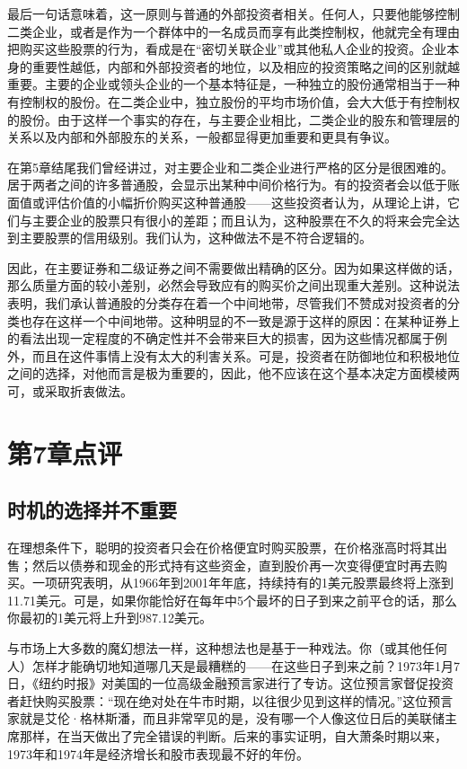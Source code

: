 \documentclass[12pt,oneside]{book}
\begin{document}
最后一句话意味着，这一原则与普通的外部投资者相关。任何人，只要他能够控制二类企业，或者是作为一个群体中的一名成员而享有此类控制权，他就完全有理由把购买这些股票的行为，看成是在“密切关联企业”或其他私人企业的投资。企业本身的重要性越低，内部和外部投资者的地位，以及相应的投资策略之间的区别就越重要。主要的企业或领头企业的一个基本特征是，一种独立的股份通常相当于一种有控制权的股份。在二类企业中，独立股份的平均市场价值，会大大低于有控制权的股份。由于这样一个事实的存在，与主要企业相比，二类企业的股东和管理层的关系以及内部和外部股东的关系，一般都显得更加重要和更具有争议。

在第5章结尾我们曾经讲过，对主要企业和二类企业进行严格的区分是很困难的。居于两者之间的许多普通股，会显示出某种中间价格行为。有的投资者会以低于账面值或评估价值的小幅折价购买这种普通股——这些投资者认为，从理论上讲，它们与主要企业的股票只有很小的差距；而且认为，这种股票在不久的将来会完全达到主要股票的信用级别。我们认为，这种做法不是不符合逻辑的。

因此，在主要证券和二级证券之间不需要做出精确的区分。因为如果这样做的话，那么质量方面的较小差别，必然会导致应有的购买价之间出现重大差别。这种说法表明，我们承认普通股的分类存在着一个中间地带，尽管我们不赞成对投资者的分类也存在这样一个中间地带。这种明显的不一致是源于这样的原因：在某种证券上的看法出现一定程度的不确定性并不会带来巨大的损害，因为这些情况都属于例外，而且在这件事情上没有太大的利害关系。可是，投资者在防御地位和积极地位之间的选择，对他而言是极为重要的，因此，他不应该在这个基本决定方面模棱两可，或采取折衷做法。


\section{第7章点评}
\subsection{时机的选择并不重要}
在理想条件下，聪明的投资者只会在价格便宜时购买股票，在价格涨高时将其出售；然后以债券和现金的形式持有这些资金，直到股价再一次变得便宜时再去购买。一项研究表明，从1966年到2001年年底，持续持有的1美元股票最终将上涨到11.71美元。可是，如果你能恰好在每年中5个最坏的日子到来之前平仓的话，那么你最初的1美元将上升到987.12美元。

与市场上大多数的魔幻想法一样，这种想法也是基于一种戏法。你（或其他任何人）怎样才能确切地知道哪几天是最糟糕的——在这些日子到来之前？1973年1月7日，《纽约时报》对美国的一位高级金融预言家进行了专访。这位预言家督促投资者赶快购买股票：“现在绝对处在牛市时期，以往很少见到这样的情况。”这位预言家就是艾伦·格林斯潘，而且非常罕见的是，没有哪一个人像这位日后的美联储主席那样，在当天做出了完全错误的判断。后来的事实证明，自大萧条时期以来，1973年和1974年是经济增长和股市表现最不好的年份。
\end{document}
